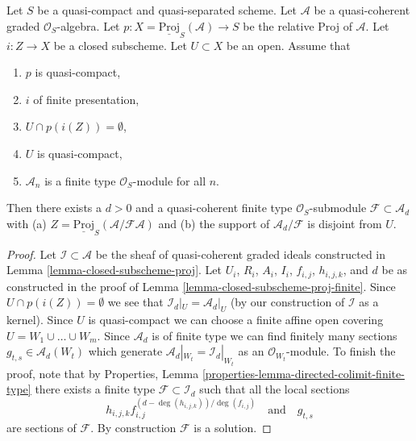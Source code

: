 \begin{lemma}
\label{lemma-closed-subscheme-proj-finite-type}
Let $S$ be a quasi-compact and quasi-separated scheme.
Let $\mathcal{A}$ be a quasi-coherent graded $\mathcal{O}_S$-algebra.
Let $p : X = \underline{\text{Proj}}_S(\mathcal{A}) \to S$ be the relative
Proj of $\mathcal{A}$. Let $i : Z \to X$ be a closed subscheme.
Let $U \subset X$ be an open. Assume that
\begin{enumerate}
\item $p$ is quasi-compact,
\item $i$ of finite presentation,
\item $U \cap p(i(Z)) = \emptyset$,
\item $U$ is quasi-compact,
\item $\mathcal{A}_n$ is a finite type $\mathcal{O}_S$-module for all $n$.
\end{enumerate}
Then there exists a $d > 0$ and a quasi-coherent finite type
$\mathcal{O}_S$-submodule $\mathcal{F} \subset \mathcal{A}_d$ with (a)
$Z = \underline{\text{Proj}}_S(\mathcal{A}/\mathcal{F}\mathcal{A})$
and (b) the support of $\mathcal{A}_d/\mathcal{F}$ is disjoint from $U$.
\end{lemma}

\begin{proof}
Let $\mathcal{I} \subset \mathcal{A}$ be the sheaf of quasi-coherent
graded ideals constructed in Lemma \ref{lemma-closed-subscheme-proj}.
Let $U_i$, $R_i$, $A_i$, $I_i$, $f_{i, j}$, $h_{i, j, k}$, and $d$
be as constructed in the proof of
Lemma \ref{lemma-closed-subscheme-proj-finite}.
Since $U \cap p(i(Z)) = \emptyset$ we see that
$\mathcal{I}_d|_U = \mathcal{A}_d|_U$ (by our construction of
$\mathcal{I}$ as a kernel). Since $U$ is quasi-compact we
can choose a finite affine open covering $U = W_1 \cup \ldots \cup W_m$.
Since $\mathcal{A}_d$ is of finite type we can find finitely many sections
$g_{t, s} \in \mathcal{A}_d(W_t)$ which generate
$\mathcal{A}_d|_{W_t} = \mathcal{I}_d|_{W_t}$
as an $\mathcal{O}_{W_t}$-module. To finish the proof, note that by
Properties, Lemma \ref{properties-lemma-directed-colimit-finite-type}
there exists a finite type $\mathcal{F} \subset \mathcal{I}_d$
such that all the local sections
$$
h_{i, j, k}f_{i, j}^{(d - \deg(h_{i, j, k}))/\deg(f_{i, j})}
\quad\text{and}\quad
g_{t, s}
$$
are sections of $\mathcal{F}$. By construction $\mathcal{F}$ is a solution.
\end{proof}






